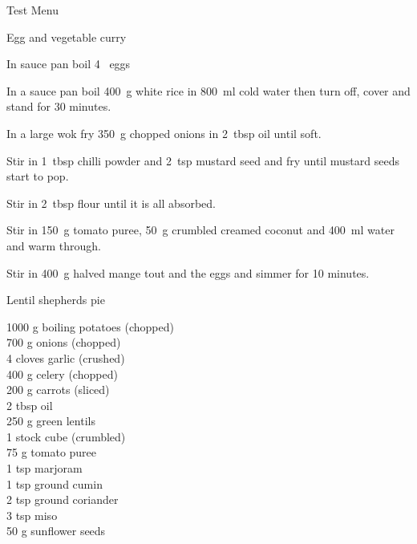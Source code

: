 \begin{menu}{Test Menu}
\begin{recipe}{2}{Egg and vegetable curry}
    \begin{instructions}
    \item 
        In sauce pan boil
        4~  eggs\item 
      In a
      sauce pan
      boil
      400~g  white rice
      in
      800~ml  cold water
      then turn off, cover and stand for 30 minutes.
    \item 
        In a large wok fry
        350~g chopped onions
        in
        2~tbsp  oil
        until soft.
      \item 
        Stir in 1~tbsp  chilli powder
        and
        2~tsp  mustard seed
        and fry until mustard seeds start to pop.
      \item 
        Stir in
        2~tbsp  flour
        until it is all absorbed.
      \item 
        Stir in
        150~g  tomato puree,
        50~g crumbled creamed coconut
        and
        400~ml  water
        and warm through.
      \item 
        Stir in
        400~g halved mange tout
        and the eggs
        and simmer for 10 minutes.
      
    \end{instructions}
    \end{recipe}%
  
    \begin{recipe}{2}{Lentil shepherds pie}%
    
		\begin{ingredients}
		1000 g boiling potatoes (chopped) \\
	700 g onions (chopped) \\
	4 cloves garlic (crushed) \\
	400 g celery (chopped) \\
	200 g carrots (sliced) \\
	2 tbsp oil  \\
	250 g green lentils  \\
	1  stock cube (crumbled) \\
	75 g tomato puree  \\
	1 tsp marjoram  \\
	1 tsp ground cumin  \\
	2 tsp ground coriander  \\
	3 tsp miso  \\
	50 g sunflower seeds  \\
	
		\end{ingredients}
	

\end{recipe}
\end{menu}
